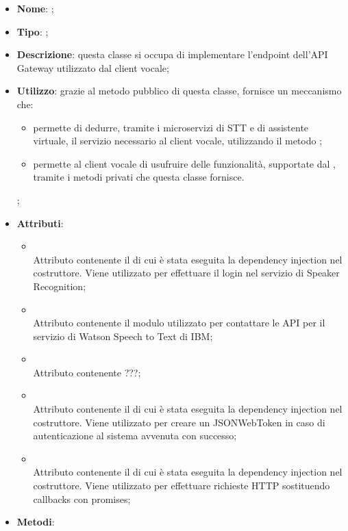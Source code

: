 \begin{itemize}
	\item \textbf{Nome}: ;
	\item \textbf{Tipo}: ;
	\item \textbf{Descrizione}: questa classe si occupa di implementare l'endpoint dell'API Gateway utilizzato dal client vocale;
	\item \textbf{Utilizzo}: grazie al metodo pubblico di questa classe, fornisce un meccanismo che:
\begin{itemize}
  \item permette di dedurre, tramite i microservizi di STT e di assistente virtuale, il servizio necessario al client vocale, utilizzando il metodo ;
  \item permette al client vocale di usufruire delle funzionalità, supportate dal , tramite i metodi privati che questa classe fornisce.
\end{itemize}
;
	\item \textbf{Attributi}:
	\begin{itemize}
		\item[]  \\
		Attributo contenente il  di cui è stata eseguita la dependency injection nel costruttore. Viene utilizzato per effettuare il login nel servizio di Speaker Recognition;
		\item[]  \\
		Attributo contenente il modulo utilizzato per contattare le API per il servizio di Watson Speech to Text di IBM;
		\item[]  \\
		Attributo contenente ???;
		\item[]  \\
		Attributo contenente il  di cui è stata eseguita la dependency injection nel costruttore. Viene utilizzato per creare un JSONWebToken in caso di autenticazione al sistema avvenuta con successo;
		\item[]  \\
		Attributo contenente il  di cui è stata eseguita la dependency injection nel costruttore. Viene utilizzato per effettuare richieste HTTP sostituendo callbacks con promises;
	\end{itemize}
	\item \textbf{Metodi}:

\end{itemize}
